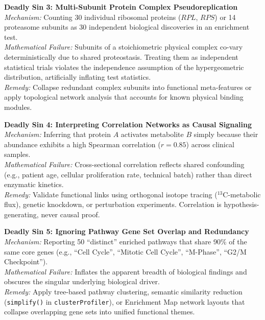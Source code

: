 \documentclass[11pt,twoside,openright]{book}
\begin{document}
\begin{pitfallbox}
\textbf{Deadly Sin 3: Multi-Subunit Protein Complex Pseudoreplication}\\
\textit{Mechanism:} Counting 30 individual ribosomal proteins ($RPL$, $RPS$) or 14 proteasome subunits as 30 independent biological discoveries in an enrichment test.\\
\textit{Mathematical Failure:} Subunits of a stoichiometric physical complex co-vary deterministically due to shared proteostasis. Treating them as independent statistical trials violates the independence assumption of the hypergeometric distribution, artificially inflating test statistics.\\
\textit{Remedy:} Collapse redundant complex subunits into functional meta-features or apply topological network analysis that accounts for known physical binding modules.
\end{pitfallbox}

\begin{pitfallbox}
\textbf{Deadly Sin 4: Interpreting Correlation Networks as Causal Signaling}\\
\textit{Mechanism:} Inferring that protein $A$ activates metabolite $B$ simply because their abundance exhibits a high Spearman correlation ($r = 0.85$) across clinical samples.\\
\textit{Mathematical Failure:} Cross-sectional correlation reflects shared confounding (e.g., patient age, cellular proliferation rate, technical batch) rather than direct enzymatic kinetics.\\
\textit{Remedy:} Validate functional links using orthogonal isotope tracing ($^{13}\text{C}$-metabolic flux), genetic knockdown, or perturbation experiments. Correlation is hypothesis-generating, never causal proof.
\end{pitfallbox}

\begin{pitfallbox}
\textbf{Deadly Sin 5: Ignoring Pathway Gene Set Overlap and Redundancy}\\
\textit{Mechanism:} Reporting 50 ``distinct'' enriched pathways that share 90\% of the same core genes (e.g., ``Cell Cycle'', ``Mitotic Cell Cycle'', ``M-Phase'', ``G2/M Checkpoint'').\\
\textit{Mathematical Failure:} Inflates the apparent breadth of biological findings and obscures the singular underlying biological driver.\\
\textit{Remedy:} Apply tree-based pathway clustering, semantic similarity reduction (\texttt{simplify()} in \texttt{clusterProfiler}), or Enrichment Map network layouts that collapse overlapping gene sets into unified functional themes.
\end{pitfallbox}
\end{document}
